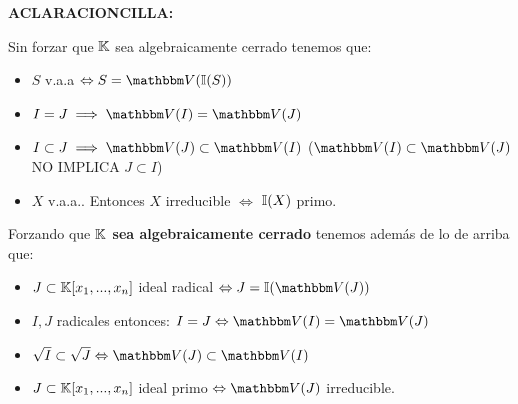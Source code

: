 \textbf{ACLARACIONCILLA:}

Sin forzar que $\mathbb{K}$ sea algebraicamente cerrado tenemos que:
\begin{itemize}
	\item $S$ v.a.a $\Leftrightarrow S=\V(\I(S))$
	\item $I=J \implies \V(I)=\V(J)$
	\item $I \subset J \implies \V(J) \subset \V(I)$ ($\V(I) \subset \V(J)$ NO IMPLICA $J \subset I$)
	\item $X$ v.a.a.. Entonces $X$ irreducible $\Leftrightarrow$ $\mathbb{I}(X)$ primo.
\end{itemize}

Forzando que \textbf{$\mathbb{K}$ sea algebraicamente cerrado} tenemos además de lo de arriba que:
\begin{itemize}
	\item $J \subset \mathbb{K}[x_1,...,x_n]$ ideal radical $\Leftrightarrow J=\I(\V(J))$
	\item $I,J$ radicales entonces: $I=J \Leftrightarrow \V(I)=\V(J)$
	\item $\sqrt{I} \subset \sqrt{J} \Leftrightarrow \V(J) \subset \V(I)$
	\item $J \subset \mathbb{K}[x_1,...,x_n]$ ideal primo $\Leftrightarrow \V(J)$ irreducible.
\end{itemize}
